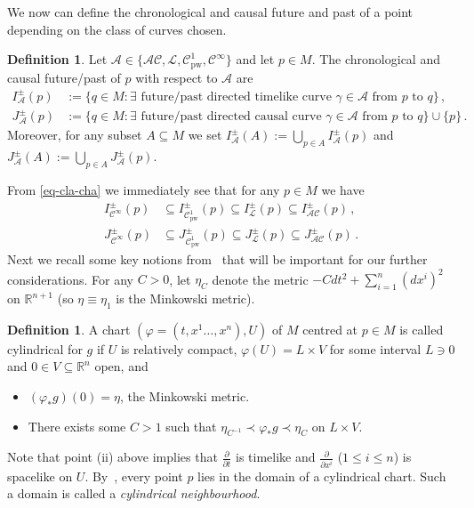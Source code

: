 \documentclass[reqno]{amsart}
\numberwithin{equation}{section}
\theoremstyle{plain}
\theoremstyle{definition}
\newtheorem{definition}[theorem]{Definition}
\theoremstyle{remark}
\newcommand\R{\ensuremath{\mathbb{R}}}
\renewcommand\le{\leqslant}
\newcommand{\Con}{\mathcal{C}}
\newcommand{\copw}{\mathcal{C}^1_{\mathrm{pw}}}
\newcommand{\vphi}{\varphi}
\begin{document}
We now can define the chronological and causal future and past of a point depending on the class of curves chosen.
\begin{definition}
\label{2.5}
Let $\mathcal{A}\in\{\mathcal{AC}, \mathcal{L}, \copw, \Con^\infty\}$ and let $p\in M$. The chronological and causal 
future/past of $p$ with respect to $\mathcal{A}$ are
\begin{align}
I^\pm_{\mathcal{A}}(p)&:=\{q\in M: \exists\text{ future/past directed timelike curve } \gamma\in\mathcal{A} \text{ from 
}p\text{ to }q\}\,,\\
J^\pm_{\mathcal{A}}(p)&:=\{q\in M: \exists\text{ future/past directed causal curve } \gamma\in\mathcal{A} \text{ from 
}p\text{ to }q\}\cup \{p\}\,.
\end{align}
Moreover, for any subset $A\subseteq M$ we set $I^\pm_{\mathcal{A}}(A):=\bigcup_{p\in A} I^\pm_{\mathcal{A}}(p)$ and 
$J^\pm_{\mathcal{A}}(A):=\bigcup_{p\in A}J^\pm_{\mathcal{A}}(p)$.
\end{definition}
From \eqref{eq-cla-cha} we immediately see that for any $p\in M$ we have
\begin{align}
 I^\pm_{\mathcal{C}^\infty}(p)&\subseteq I^\pm_{\copw}(p)\subseteq I^\pm_{\mathcal{L}}(p)\subseteq I^\pm_{\mathcal{AC}}(p)\,,\\
 J^\pm_{\mathcal{C}^\infty}(p)&\subseteq J^\pm_{\copw}(p)\subseteq J^\pm_{\mathcal{L}}(p)\subseteq J^\pm_{\mathcal{AC}}(p)\,.
\end{align}
Next we recall some key notions from~\cite{CG:12} that will be important for our further considerations. 
For any $C>0$, let $\eta_C$ denote the metric $-Cdt^2 + \sum_{i=1}^n (dx^i)^2$ on $\R^{n+1}$ (so $\eta\equiv\eta_1$
is the Minkowski metric).
\begin{definition}\label{cylindric}
A chart $(\varphi=(t,x^1\dots,x^n),U)$ of $M$ centred at $p\in M$ is called cylindrical for $g$ if $U$ is relatively compact, 
$\vphi(U)=L\times V$ for some interval $L\ni 0$ and $0\in V\subseteq \R^n$ open, and
\begin{itemize}
\item[(i)] $(\varphi_*g)(0) = \eta$, the Minkowski metric.
\item[(ii)] There exists some $C>1$ such that $\eta_{C^{-1}}\prec \vphi_* g \prec \eta_C$
on $L\times V$.
\end{itemize}
\end{definition}
Note that point (ii) above implies that $\frac{\partial}{\partial t}$ is timelike and $\frac{\partial}{\partial x^i}$ ($1\le i\le n$) is spacelike on $U$.
By~\cite[Prop.\ 1.10]{CG:12}, every point $p$ lies in the domain of a cylindrical chart. Such a domain is called a 
\emph{cylindrical neighbourhood}.
\end{document}
